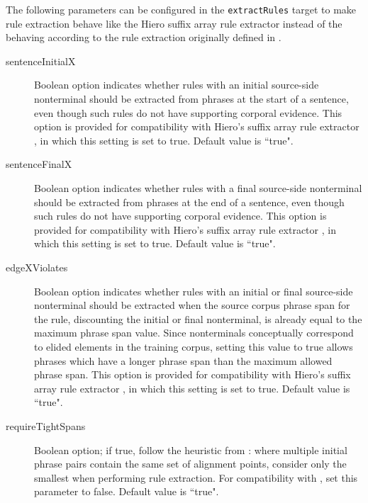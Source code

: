 \documentclass{pbml}
\newcommand{\newcite}{\namecite}
\begin{document}
The following parameters can be configured in the {\tt extractRules} target to make rule extraction behave like the Hiero suffix array rule extractor {\protect \cite{Lopez2008} } instead of the behaving according to the rule extraction originally defined in {\protect \newcite{Chiang2005}} .

\begin{description}

	\item[sentenceInitialX] Boolean option indicates whether rules with an initial source-side nonterminal should be extracted from phrases at the start of a sentence, even though such rules do not have supporting corporal evidence. This option is provided for compatibility with Hiero's suffix array rule extractor \cite{Lopez2008}, in which this setting is set to true. Default value is ``true".

	\item[sentenceFinalX] Boolean option indicates whether rules with a final source-side nonterminal should be extracted from phrases at the end of a sentence, even though such rules do not have supporting corporal evidence. This option is provided for compatibility with Hiero's suffix array rule extractor \cite{Lopez2008}, in which this setting is set to true. Default value is ``true".

	\item[edgeXViolates] Boolean option indicates whether rules with an initial or final source-side nonterminal should be extracted when the source corpus phrase span for the rule, discounting the initial or final nonterminal, is already equal to the maximum phrase span value. Since nonterminals conceptually correspond to elided elements in the training corpus, setting this value to true allows phrases which have a longer phrase span than the maximum allowed phrase span. This option is provided for compatibility with Hiero's suffix array rule extractor \cite{Lopez2008}, in which this setting is set to true. Default value is ``true".

	\item[requireTightSpans] Boolean option; if true, follow the heuristic from \cite{Chiang2005}: where multiple initial phrase pairs contain the same set of alignment points, consider only the smallest when performing rule extraction. For compatibility with \newcite{Lopez2008}, set this parameter to false. Default value is ``true".

\end{description}
\end{document}
